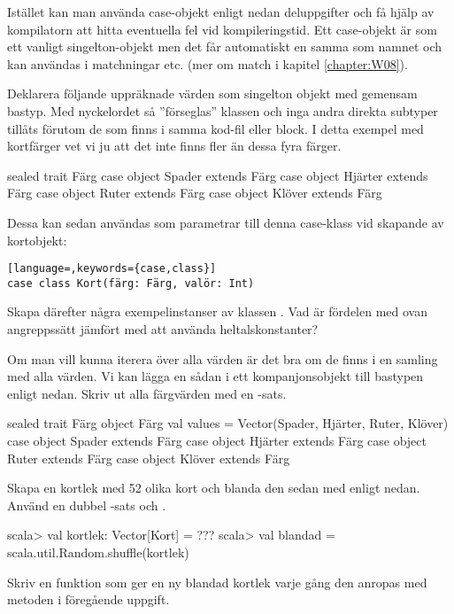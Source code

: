 Istället kan man använda case-objekt enligt nedan deluppgifter och få hjälp av kompilatorn att hitta eventuella fel vid kompileringstid.  Ett case-objekt är som ett vanligt singelton-objekt men det får automatiskt en  samma som namnet och kan användas i matchningar etc. (mer om match i kapitel \ref{chapter:W08}).

\Subtask Deklarera följande uppräknade värden som singelton objekt med gemensam bastyp. Med nyckelordet  så ''förseglas'' klassen och inga andra direkta subtyper tillåts förutom de som finns i samma kod-fil eller block. I detta exempel  med kortfärger vet vi ju att det inte finns fler än dessa fyra färger.
\begin{Code}
sealed trait Färg
case object Spader extends Färg
case object Hjärter extends Färg
case object Ruter extends Färg
case object Klöver extends Färg
\end{Code}
Dessa kan sedan användas som parametrar till denna case-klass vid skapande av kortobjekt:
\begin{lstlisting}[language=,keywords={case,class}]
case class Kort(färg: Färg, valör: Int)
\end{lstlisting}
Skapa därefter några exempelinstanser av klassen . Vad är fördelen med ovan angreppssätt jämfört med att använda heltalskonstanter?

\Subtask Om man vill kunna iterera över alla värden är det bra om de finns i en samling med alla värden. Vi kan lägga en sådan i ett kompanjonsobjekt till bastypen enligt nedan. Skriv ut alla färgvärden med en -sats.

\begin{Code}
sealed trait Färg
object Färg {
  val values = Vector(Spader, Hjärter, Ruter, Klöver)
}
case object Spader extends Färg
case object Hjärter extends Färg
case object Ruter extends Färg
case object Klöver extends Färg
\end{Code}
Skapa en kortlek med 52 olika kort och blanda den sedan med  enligt nedan. Använd en dubbel -sats och .
\begin{REPL}
scala> val kortlek: Vector[Kort] = ???
scala> val blandad = scala.util.Random.shuffle(kortlek)
\end{REPL}

\Subtask Skriv en funktion  som ger en ny blandad kortlek varje gång den anropas med metoden i föregående uppgift.




